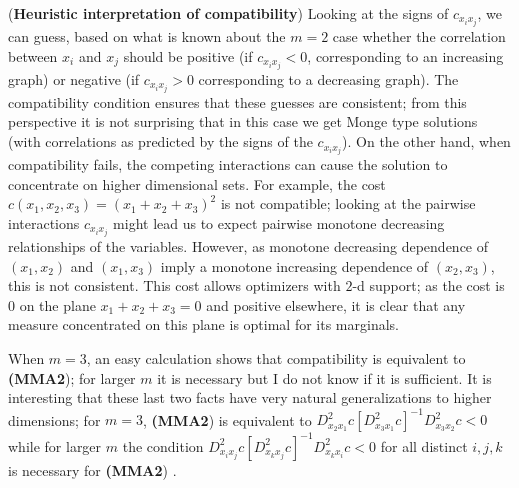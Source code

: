 \documentclass[letter,10pt]{article}
\theoremstyle{dotless}
\begin{document}
\begin{comprem}
(\textbf{Heuristic interpretation of compatibility}) Looking at the signs of $c_{x_ix_j}$, we can guess, based on what is known about the $m=2$ case whether the correlation between $x_i$ and $x_j$ should be positive (if $c_{x_ix_j}<0$, corresponding to an increasing graph) or negative (if $c_{x_ix_j}>0$ corresponding to a decreasing graph).  The compatibility condition ensures that these guesses are consistent; from this perspective it is not surprising that in this case we get Monge type solutions (with correlations as predicted by the signs of the $c_{x_ix_j}$).  On the other hand, when compatibility fails, the competing interactions can cause the solution to concentrate on higher dimensional sets.  For example, the cost $c(x_1,x_2,x_3) =(x_1+x_2+x_3)^2$ is not compatible; looking at the pairwise interactions $ c_{x_ix_j}$ might lead us to expect pairwise monotone decreasing relationships of the variables.  However, as  monotone decreasing dependence of $(x_1,x_2)$ and $(x_1,x_3)$ imply a  monotone increasing dependence of $(x_2,x_3)$, this is not consistent.  This cost allows optimizers with $2$-d support; as the cost is $0$ on the plane $x_1+x_2+x_3=0$ and positive elsewhere, it is clear that any measure concentrated on this plane is optimal for its marginals.
\end{comprem}
When $m=3$, an easy calculation shows that compatibility is equivalent to \textbf{(MMA2}); for larger $m$ it is necessary but I do not know if it is sufficient.  It is interesting that these last two facts have very natural generalizations to higher dimensions; for $m=3$, \textbf{(MMA2}) is equivalent to $D^2_{x_2x_1}c[D^2_{x_3x_1}c]^{-1}D^2_{x_3x_2}c<0$ while for larger $m$ the condition $D^2_{x_ix_j}c[D^2_{x_kx_j}c]^{-1}D^2_{x_kx_i}c<0$ for all distinct $i,j,k$ is necessary for \textbf{(MMA2}) \cite{P4}.

\end{document}
